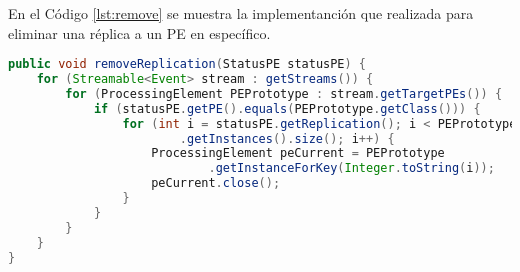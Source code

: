 En el C\'odigo \ref{lst:remove} se muestra la implementanci\'on que realizada para eliminar una r\'eplica a un PE en espec\'ifico.

\begin{lstlisting}[caption={Eliminar r\'eplicas a un PE en S4.},label={lst:remove},language=Java]
public void removeReplication(StatusPE statusPE) {
	for (Streamable<Event> stream : getStreams()) {
		for (ProcessingElement PEPrototype : stream.getTargetPEs()) {
			if (statusPE.getPE().equals(PEPrototype.getClass())) {
				for (int i = statusPE.getReplication(); i < PEPrototype
						.getInstances().size(); i++) {
					ProcessingElement peCurrent = PEPrototype
							.getInstanceForKey(Integer.toString(i));
					peCurrent.close();
				}
			}
		}
	}
}
\end{lstlisting}